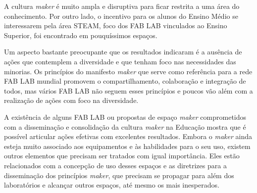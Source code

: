 \documentclass[portuguese]{textolivre}
\begin{document}
A cultura \textit{maker} é muito ampla e disruptiva para ficar restrita a uma área do conhecimento. Por outro lado, o incentivo para os alunos do Ensino Médio se interessarem pela área STEAM, foco dos FAB LAB vinculados ao Ensino Superior, foi encontrado em pouquíssimos espaços.

Um aspecto bastante preocupante que os resultados indicaram é a ausência de ações que contemplem a diversidade e que tenham foco nas necessidades das minorias. Os princípios do manifesto \textit{maker} que serve como referência para a rede FAB LAB mundial promovem o compartilhamento, colaboração e integração de todos, mas vários FAB LAB não seguem esses princípios e poucos vão além com a realização de ações com foco na diversidade.

A existência de alguns FAB LAB ou propostas de espaço \textit{maker} comprometidos com a disseminação e consolidação da cultura \textit{maker} na Educação mostra que é possível articular ações efetivas com excelentes resultados. Embora o \textit{maker} ainda esteja muito associado aos equipamentos e às habilidades para o seu uso, existem outros elementos que precisam ser tratados com igual importância. Eles estão relacionados com a concepção de uso desses espaços e as diretrizes para a disseminação dos princípios \textit{maker}, que precisam se propagar para além dos laboratórios e alcançar outros espaços, até mesmo os mais inesperados.


\printbibliography\label{sec-bib}
\end{document}
